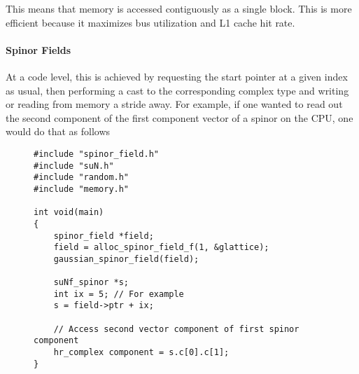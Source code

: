 \documentclass[12pt]{article}
\begin{document}
This means that memory is accessed contiguously as a single block. This is more efficient because it maximizes bus utilization and L1 cache hit rate.

\paragraph{Spinor Fields}
At a code level, this is achieved by requesting the start pointer at a given index as usual, then performing a cast to the corresponding complex type and writing or reading from memory a stride away. For example, if one wanted to read out the second component of the first component vector of a spinor on the CPU, one would do that as follows

\begin{figure}[H]
\begin{lstlisting}[caption=Low level access of single components on CPU]
#include "spinor_field.h"
#include "suN.h"
#include "random.h"
#include "memory.h"

int void(main)
{
    spinor_field *field;
    field = alloc_spinor_field_f(1, &glattice);
    gaussian_spinor_field(field);

    suNf_spinor *s;
    int ix = 5; // For example
    s = field->ptr + ix;

    // Access second vector component of first spinor component
    hr_complex component = s.c[0].c[1];
}
\end{lstlisting}
\end{figure}
\end{document}

